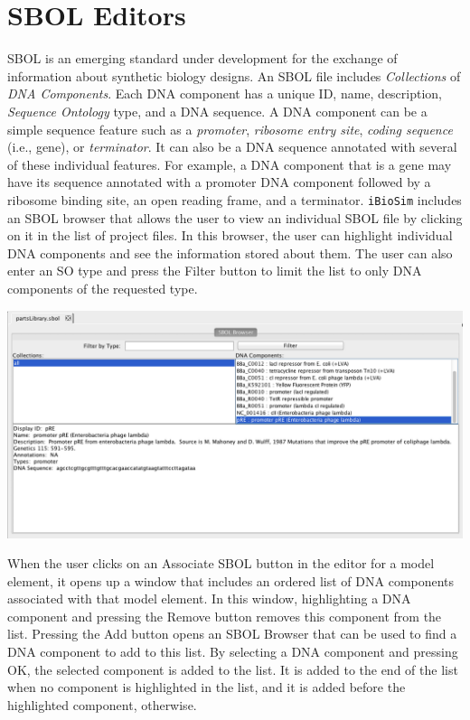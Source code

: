 \documentclass[titlepage,11pt]{article}
\begin{document}
\clearpage

\section{\label{SBOL}SBOL Editors}

SBOL is an emerging standard under development for the exchange of information about synthetic biology designs.  An SBOL file includes \emph{Collections} of \emph{DNA Components}.  Each DNA component has a unique ID, name, description, \emph{Sequence Ontology} type, and a DNA sequence.  A DNA component can be a simple sequence feature such as a \emph{promoter}, \emph{ribosome entry site}, \emph{coding sequence} (i.e., gene), or \emph{terminator}.  It can also be a DNA sequence annotated with several of these individual features.  For example, a DNA component that is a gene may have its sequence annotated with a promoter DNA component followed by a ribosome binding site, an open reading frame, and a terminator.  {\tt iBioSim} includes an SBOL browser that allows the user to view an individual SBOL file by clicking on it in the list of project files.  In this browser, the user can highlight individual DNA components and see the information stored about them.  The user can also enter an SO type and press the Filter button to limit the list to only DNA components of the requested type.

\begin{center}
\includegraphics[width=160mm]{screenshots/SBOLBrowser}
\end{center}

When the user clicks on an Associate SBOL button in the editor for a model element, it opens up a window that includes an ordered list of DNA components associated with that model element.  In this window, highlighting a DNA component and pressing the Remove button removes this component from the list.  Pressing the Add button opens an SBOL Browser that can be used to find a DNA component to add to this list.  By selecting a DNA component and pressing OK, the selected component is added to the list.  It is added to the end of the list when no component is highlighted in the list, and it is added before the highlighted component, otherwise.
\end{document}
